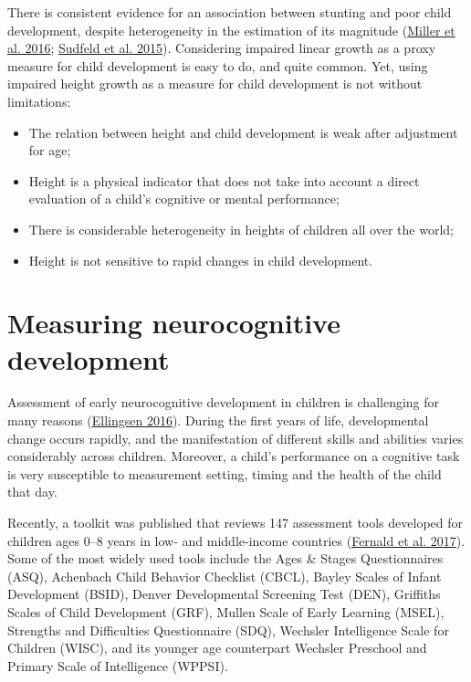 \documentclass[
]{book}
\begin{document}
There is consistent evidence for an association between stunting and poor child development, despite heterogeneity in the estimation of its magnitude (\protect\hyperlink{ref-miller2016consistent}{Miller et al. 2016}; \protect\hyperlink{ref-sudfeld2015linear}{Sudfeld et al. 2015}). Considering impaired linear growth as a proxy measure for child development is easy to do, and quite common. Yet, using impaired height growth as a measure for child development is not without limitations:

\begin{itemize}
\item
  The relation between height and child development is weak after adjustment for age;
\item
  Height is a physical indicator that does not take into account a direct evaluation of a child's cognitive or mental performance;
\item
  There is considerable heterogeneity in heights of children all over the world;
\item
  Height is not sensitive to rapid changes in child development.
\end{itemize}

\hypertarget{sec:neurocognitive}{%
\section{Measuring neurocognitive development}\label{sec:neurocognitive}}

Assessment of early neurocognitive development in children is challenging for many reasons (\protect\hyperlink{ref-ellingsen2016}{Ellingsen 2016}). During the first years of life, developmental change occurs rapidly, and the manifestation of different skills and abilities varies considerably across children. Moreover, a child's performance on a cognitive task is very susceptible to measurement setting, timing and the health of the child that day.

Recently, a toolkit was published that reviews 147 assessment tools developed for children ages 0--8 years in low- and middle-income countries (\protect\hyperlink{ref-fernald2017toolkit}{Fernald et al. 2017}). Some of the most widely used tools include the Ages \& Stages Questionnaires (ASQ), Achenbach Child Behavior Checklist (CBCL), Bayley Scales of Infant Development (BSID), Denver Developmental Screening Test (DEN), Griffiths Scales of Child Development (GRF), Mullen Scale of Early Learning (MSEL), Strengths and Difficulties Questionnaire (SDQ), Wechsler Intelligence Scale for Children (WISC), and its younger age counterpart Wechsler Preschool and Primary Scale of Intelligence (WPPSI).
\end{document}
